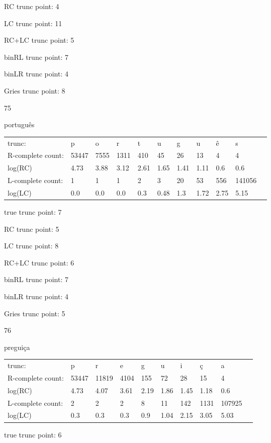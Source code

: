 \documentclass[10pt]{article}
\begin{document}
RC trunc point: 4

LC trunc point: 11

RC+LC trunc point: 5

binRL trunc point: 7

binLR trunc point: 4

Gries trunc point: 8

\vspace{1em}

75

português

\begin{tabular}{l|llllllllll}
trunc: & p & o & r & t & u & g & u & ê & s & \\ 
R-complete count: & 53447 & 7555 & 1311 & 410 & 45 & 26 & 13 & 4 & 4 & \\ 
log(RC) & 4.73 & 3.88 & 3.12 & 2.61 & 1.65 & 1.41 & 1.11 & 0.6 & 0.6 & \\ 
L-complete count: & 1 & 1 & 1 & 2 & 3 & 20 & 53 & 556 & 141056 & \\ 
log(LC) & 0.0 & 0.0 & 0.0 & 0.3 & 0.48 & 1.3 & 1.72 & 2.75 & 5.15 & \\ 
\end{tabular}

true trunc point: 7

RC trunc point: 5

LC trunc point: 8

RC+LC trunc point: 6

binRL trunc point: 7

binLR trunc point: 4

Gries trunc point: 5

\vspace{1em}

76

preguiça

\begin{tabular}{l|lllllllll}
trunc: & p & r & e & g & u & i & ç & a & \\ 
R-complete count: & 53447 & 11819 & 4104 & 155 & 72 & 28 & 15 & 4 & \\ 
log(RC) & 4.73 & 4.07 & 3.61 & 2.19 & 1.86 & 1.45 & 1.18 & 0.6 & \\ 
L-complete count: & 2 & 2 & 2 & 8 & 11 & 142 & 1131 & 107925 & \\ 
log(LC) & 0.3 & 0.3 & 0.3 & 0.9 & 1.04 & 2.15 & 3.05 & 5.03 & \\ 
\end{tabular}

true trunc point: 6
\end{document}
